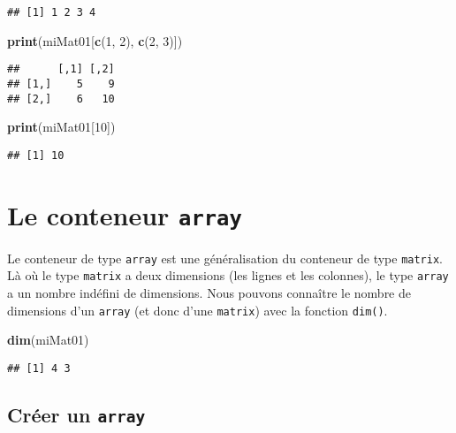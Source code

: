 \documentclass[]{book}
\newenvironment{Shaded}{\begin{snugshade}}{\end{snugshade}}
\newcommand{\KeywordTok}[1]{\textcolor[rgb]{0.13,0.29,0.53}{\textbf{#1}}}
\newcommand{\DecValTok}[1]{\textcolor[rgb]{0.00,0.00,0.81}{#1}}
\newcommand{\NormalTok}[1]{#1}
\theoremstyle{definition}
\theoremstyle{definition}
\theoremstyle{definition}
\theoremstyle{remark}
\begin{document}
\begin{verbatim}
## [1] 1 2 3 4
\end{verbatim}

\begin{Shaded}
\begin{Highlighting}[]
\KeywordTok{print}\NormalTok{(miMat01[}\KeywordTok{c}\NormalTok{(}\DecValTok{1}\NormalTok{, }\DecValTok{2}\NormalTok{), }\KeywordTok{c}\NormalTok{(}\DecValTok{2}\NormalTok{, }\DecValTok{3}\NormalTok{)])}
\end{Highlighting}
\end{Shaded}

\begin{verbatim}
##      [,1] [,2]
## [1,]    5    9
## [2,]    6   10
\end{verbatim}

\begin{Shaded}
\begin{Highlighting}[]
\KeywordTok{print}\NormalTok{(miMat01[}\DecValTok{10}\NormalTok{])}
\end{Highlighting}
\end{Shaded}

\begin{verbatim}
## [1] 10
\end{verbatim}

\hypertarget{l014array}{\section{\texorpdfstring{Le conteneur
\texttt{array}}{Le conteneur array}}\label{l014array}}

Le conteneur de type \texttt{array} est une généralisation du conteneur
de type \texttt{matrix}. Là où le type \texttt{matrix} a deux dimensions
(les lignes et les colonnes), le type \texttt{array} a un nombre
indéfini de dimensions. Nous pouvons connaître le nombre de dimensions
d'un \texttt{array} (et donc d'une \texttt{matrix}) avec la fonction
\texttt{dim()}.

\begin{Shaded}
\begin{Highlighting}[]
\KeywordTok{dim}\NormalTok{(miMat01)}
\end{Highlighting}
\end{Shaded}

\begin{verbatim}
## [1] 4 3
\end{verbatim}

\subsection{\texorpdfstring{Créer un
\texttt{array}}{Créer un array}}\label{creer-un-array}
\end{document}
